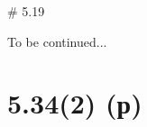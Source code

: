\documentclass[russian]{beamer}
\begin{document}
  \begin{frame}{\# 5.19}
    \centerline{To be continued...}
  \end{frame}
  
    
    
  \section{5.34(2) (р)}
  
\end{document}
